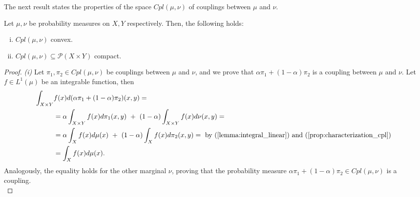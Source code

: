 \documentclass[../main.tex]{subfiles}
\begin{document}
The next result states the properties of the space $Cpl(\mu, \nu)$ of couplings between $\mu$ and $\nu$. 

\begin{proposition}
\label{prop:Cpl()_propr}
    Let $\mu, \nu$ be probability measures on $X, Y$ respectively. Then, the following holds:
    \begin{enumerate}[(i)]
        \item $Cpl(\mu, \nu)$ convex.
        \item $Cpl(\mu, \nu)\subseteq\mathcal{P}(X\times Y)$ compact.
    \end{enumerate}
\end{proposition}
\begin{proof}
    \textit{(i)} Let $\pi_1, \pi_2\in Cpl(\mu, \nu)$ be couplings between $\mu$ and $\nu$, and we prove that $\alpha\pi_1 + (1-\alpha)\pi_2$ is a coupling between $\mu$ and $\nu$. Let $f\in L^1(\mu)$ be an integrable function, then
    \begin{align*}
        \int_{X\times Y} &f(x) d(\alpha\pi_1 + (1-\alpha)\pi_2)(x, y) = \\
        &= \alpha\int_{X\times Y} f(x)d\pi_1(x,y) \ + \ (1-\alpha) \int_{X\times Y} f(x)d\nu(x,y) = \\
        &= \alpha\int_X f(x)d\mu(x) \ + \ (1-\alpha)\int_X f(x)d\pi_2(x, y) = \text{ by (\ref{lemma:integral_linear}) and  (\ref{prop:characterization_cpl})} \\
        &= \int_X f(x)d\mu(x).
    \end{align*}
    Analogously, the equality  holds for the other marginal $\nu$, proving that the probability measure $\alpha\pi_1 + (1-\alpha)\pi_2 \in Cpl(\mu,  \nu)$ is a coupling. \\


\end{proof}
\end{document}
